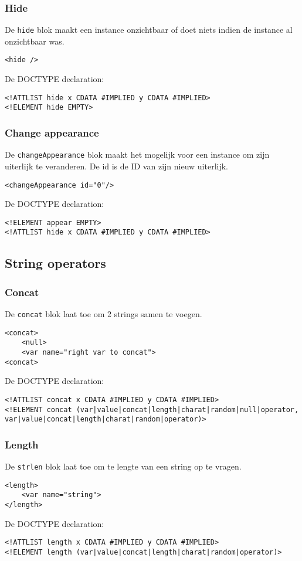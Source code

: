 \documentclass[]{article}
\begin{document}
\subsubsection{Hide}
De \texttt{hide} blok maakt een instance onzichtbaar of doet niets indien de instance al onzichtbaar was.
\lstset{language=XML}
\begin{lstlisting}
<hide />
\end{lstlisting}
De DOCTYPE declaration: 
\lstset{language=XML}
\begin{lstlisting}
<!ATTLIST hide x CDATA #IMPLIED y CDATA #IMPLIED>
<!ELEMENT hide EMPTY>
\end{lstlisting}

\subsubsection{Change appearance}
De \texttt{changeAppearance} blok maakt het mogelijk voor een instance om zijn uiterlijk te veranderen. De id is de ID van zijn nieuw uiterlijk.
\lstset{language=XML}
\begin{lstlisting}
<changeAppearance id="0"/>
\end{lstlisting}
De DOCTYPE declaration: 
\lstset{language=XML}
\begin{lstlisting}
<!ELEMENT appear EMPTY>
<!ATTLIST hide x CDATA #IMPLIED y CDATA #IMPLIED>
\end{lstlisting}

\subsection{String operators}
\subsubsection{Concat}
De \texttt{concat} blok laat toe om 2 strings samen te voegen.
\lstset{language=XML}
\begin{lstlisting}
<concat>
	<null>
	<var name="right var to concat">
<concat>
\end{lstlisting}
De DOCTYPE declaration: 
\lstset{language=XML}
\begin{lstlisting}
<!ATTLIST concat x CDATA #IMPLIED y CDATA #IMPLIED>
<!ELEMENT concat (var|value|concat|length|charat|random|null|operator, var|value|concat|length|charat|random|operator)>
\end{lstlisting}

\subsubsection{Length}
De \texttt{strlen} blok laat toe om te lengte van een string op te vragen.
\lstset{language=XML}
\begin{lstlisting}
<length>
	<var name="string">
</length>
\end{lstlisting}
De DOCTYPE declaration: 
\lstset{language=XML}
\begin{lstlisting}
<!ATTLIST length x CDATA #IMPLIED y CDATA #IMPLIED>
<!ELEMENT length (var|value|concat|length|charat|random|operator)>
\end{lstlisting}
\end{document}
